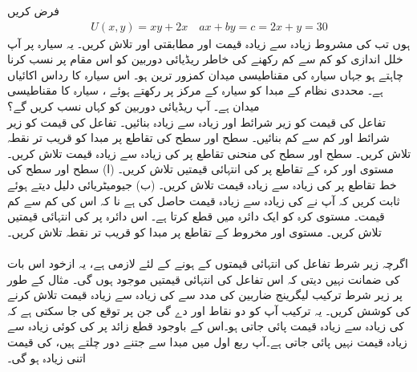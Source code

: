 فرض کریں 
\begin{align*}
U(x,y)=xy+2x \quad ax+by=c=2x+y=30
\end{align*}
ہوں تب  کی مشروط  زیادہ سے زیادہ قیمت  اور مطابقتی  اور  تلاش کریں۔
یہ سیارہ پر آپ   خلل اندازی کو کم سے کم رکھنے کی خاطر  ریڈیائی دوربین  کو اس مقام پر نسب کرنا چاہتے ہو جہاں  سیارہ  کی مقناطیسی میدان کمزور ترین ہو۔ اس سیارہ کا رداس  اکائیاں ہے۔ محددی نظام کے مبدا کو سیارہ کے مرکز پر  رکھتے ہوئے ، سیارہ  کا  مقناطیسی میدان  ہے۔ آپ ریڈیائی دوربین کو کہاں نسب کریں گے؟
\\
تفاعل  کی قیمت کو  زیر  شرائط  اور  زیادہ سے زیادہ بنائیں۔ 
تفاعل  کی قیمت کو  زیر  شرائط  اور  کم سے کم  بنائیں۔ 
سطح  اور سطح   کی  تقاطع  پر مبدا کو قریب تر نقطہ تلاش کریں۔
سطح  اور سطح   کی منحنی تقاطع  پر  کی زیادہ سے زیادہ قیمت تلاش کریں۔
مستوی  اور کرہ  کے تقاطع پر  کی انتہائی قیمتیں تلاش کریں۔
(ا) سطح  اور سطح  کی خط تقاطع پر    کی زیادہ سے زیادہ قیمت تلاش کریں۔  (ب)  جیومیٹریائی دلیل دیتے ہوئے ثابت کریں کہ آپ نے   کی زیادہ سے زیادہ قیمت حاصل کی ہے نا کہ اس کی کم سے کم قیمت۔
مستوی  کرہ  کو ایک دائرہ میں قطع کرتا ہے۔ اس دائرہ پر   کی انتہائی قیمتیں تلاش کریں۔
مستوی   اور  مخروط  کے تقاطع پر مبدا کو قریب تر نقطہ تلاش کریں۔
\\
\\
اگرچہ زیر  شرط  تفاعل   کی انتہائی قیمتوں کے ہونے کے  لئے  لازمی ہے،  یہ ازخود  اس بات کی ضمانت نہیں دیتی کہ  اس تفاعل کی انتہائی قیمتیں موجود ہوں گی۔ مثال کے طور پر زیر شرط  ترکیب لیگرینج  ضاربین کی مدد سے  کی زیادہ سے زیادہ قیمت تلاش کرنے کی کوشش کریں۔ یہ ترکیب آپ کو دو نقاط  اور  دے  گی جن پر توقع کی جا سکتی ہے کہ  کی زیادہ سے زیادہ قیمت پائی جاتی ہو۔اس کے باوجود قطع زائد   پر  کی کوئی  زیادہ سے زیادہ قیمت نہیں پائی جاتی ہے۔آپ ربع اول میں مبدا سے جتنے دور چلتے ہیں،  کی قیمت اتنی زیادہ ہو گی۔
